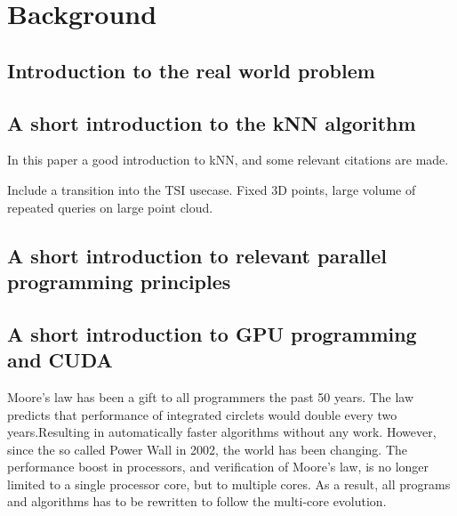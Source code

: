 \chapter{Background}

\section{Introduction to the real world problem} %
\label{sub:introduction_to_the_real_world_problem}


\section{A short introduction to the kNN algorithm} %
\label{a_short_introduction_to_the_kNN_algorithm}

\cite{Garcia2010} In this paper a good introduction to kNN, and some relevant citations are made.

Include a transition into the TSI usecase. Fixed 3D points, large volume of repeated queries on large point cloud.



\section{A short introduction to relevant parallel programming principles} %
\label{sub:a_short_introduction_to_relevant_parallel_programming_principles}


\section{A short introduction to GPU programming and CUDA} %
\label{sub:a_short_introduction_to_gpu_programming_and_cuda}

Moore's law has been a gift to all programmers the past 50 years. The law predicts that performance of integrated circlets would double every two years.Resulting in automatically faster algorithms without any work. However, since the so called Power Wall in 2002, the world has been changing. The performance boost  in processors, and verification of Moore's law, is no longer limited to a single processor core, but to multiple cores. As a result, all programs and algorithms has to be rewritten to follow the multi-core evolution.



